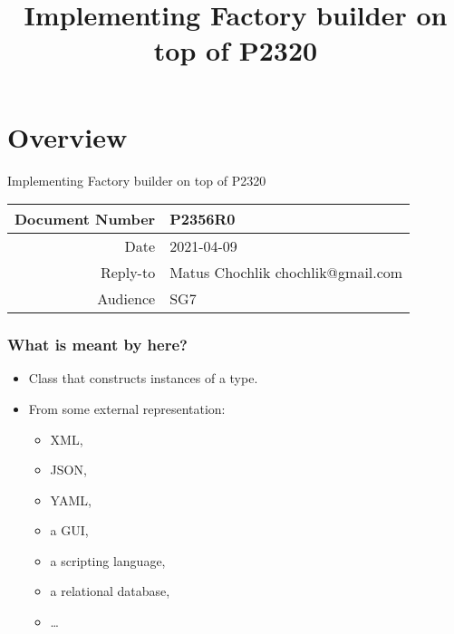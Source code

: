 \documentclass[compress,table,xcolor=table]{beamer}
\begin{document}
\title{Implementing Factory builder on top of P2320}
\section{Overview}
\begin{frame}
	\Large
	Implementing Factory builder on top of P2320
	\vfill
    \normalsize
	\begin{tabular}{|r|l|}
	\hline
	Document Number & P2356R0 \\
	\hline
	Date & 2021-04-09 \\
	\hline
	Reply-to & Matus Chochlik chochlik@gmail.com \\
	\hline
	Audience & SG7 \\
	\hline
	\end{tabular}
	\vfill
\end{frame}
\begin{frame}
    \Huge
    \vfill
    \LARGE
\end{frame}
\begin{frame}
\frametitle{What is meant by  here?}
  \Large
  \begin{itemize}
      \item Class that constructs instances of a  type.
      \item From some external representation:
      \begin{itemize}
        \large
      \item XML,
      \item JSON,
      \item YAML,
      \item a GUI,
      \item a scripting language,
      \item a relational database,
      \item \ldots
      \end{itemize}
  \end{itemize}
\end{frame}
\end{document}
